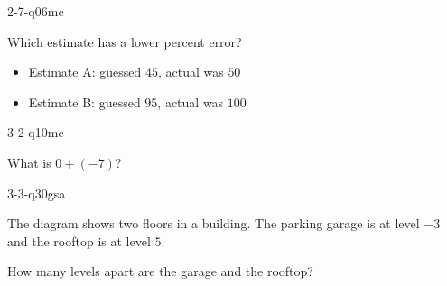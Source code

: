 \begin{practiceQuestion}{2-7-q06}{mc}
\begin{questionText}
Which estimate has a lower percent error?
\begin{itemize}
    \item Estimate A: guessed $45$, actual was $50$
    \item Estimate B: guessed $95$, actual was $100$
\end{itemize}
\end{questionText}
\end{practiceQuestion}

\begin{practiceQuestion}{3-2-q10}{mc}
\begin{questionText}
What is $0 + (-7)$?
\end{questionText}
\end{practiceQuestion}

\begin{practiceQuestion}{3-3-q30}{gsa}
\begin{questionText}
The diagram shows two floors in a building. The parking garage is at level $-3$ and the rooftop is at level $5$.

\begin{center}
\end{center}

How many levels apart are the garage and the rooftop?
\end{questionText}
\end{practiceQuestion}

